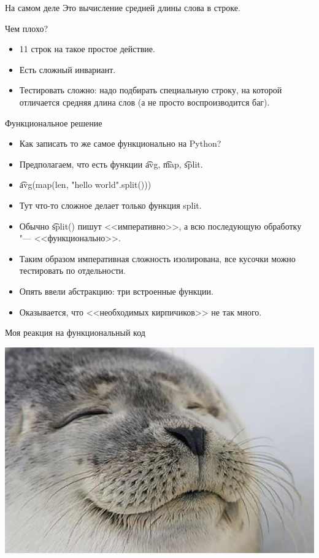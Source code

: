 \begin{frame}[fragile]{На самом деле}
	Это вычисление средней длины слова в строке.

	Чем плохо?
	\begin{itemize}
		\item 11 строк на такое простое действие.
		\item Есть сложный инвариант.
		\item Тестировать сложно: надо подбирать специальную строку, на которой отличается средняя длина слов (а не просто воспроизводится баг).
	\end{itemize}
\end{frame}

\begin{frame}{Функциональное решение}
	\begin{itemize}
		\item Как записать то же самое функционально на Python? \pause
		\item Предполагаем, что есть функции \t{avg}, \t{map}, \t{split}. \pause
		\item \t{avg(map(len, "hello world".split()))} \pause
		\item Тут что-то сложное делает только функция split.
		\item Обычно \t{split()} пишут <<императивно>>, а всю последующую обработку "--- <<функционально>>.
		\item Таким образом императивная сложность изолирована, все кусочки можно тестировать по отдельности.
		\item Опять ввели абстракцию: три встроенные функции.
		\item Оказывается, что <<необходимых кирпичиков>> не так много.
	\end{itemize}
\end{frame}

\begin{frame}{Моя реакция на функциональный код}
	\begin{center}
		\includegraphics[scale=0.3]{satisfied-seal.jpg}
	\end{center}
\end{frame}

